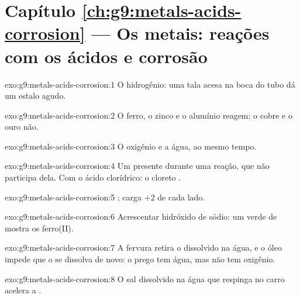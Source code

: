 \section*{Capítulo \ref{ch:g9:metals-acids-corrosion} --- Os metais: reações com os ácidos e corrosão}

\begin{solution}{exo:g9:metals-acids-corrosion:1}
O hidrogênio: uma tala acesa na boca do tubo dá um estalo agudo.
\end{solution}

\begin{solution}{exo:g9:metals-acids-corrosion:2}
O ferro, o zinco e o alumínio reagem; o cobre e o ouro não.
\end{solution}

\begin{solution}{exo:g9:metals-acids-corrosion:3}
O oxigênio e a água, ao mesmo tempo.
\end{solution}

\begin{solution}{exo:g9:metals-acids-corrosion:4}
Um  presente durante uma reação, que não participa dela. Com o ácido
clorídrico: o  cloreto .
\end{solution}

\begin{solution}{exo:g9:metals-acids-corrosion:5}
; carga $+2$ de cada lado.
\end{solution}

\begin{solution}{exo:g9:metals-acids-corrosion:6}
Acrescentar hidróxido de sódio: um  verde de 
mostra os  ferro(II).
\end{solution}

\begin{solution}{exo:g9:metals-acids-corrosion:7}
A fervura retira o  dissolvido na água, e o óleo impede que o  se
dissolva de novo: o prego tem água, mas não tem oxigênio.
\end{solution}

\begin{solution}{exo:g9:metals-acids-corrosion:8}
O sal dissolvido na água que respinga no carro acelera a .
\end{solution}

